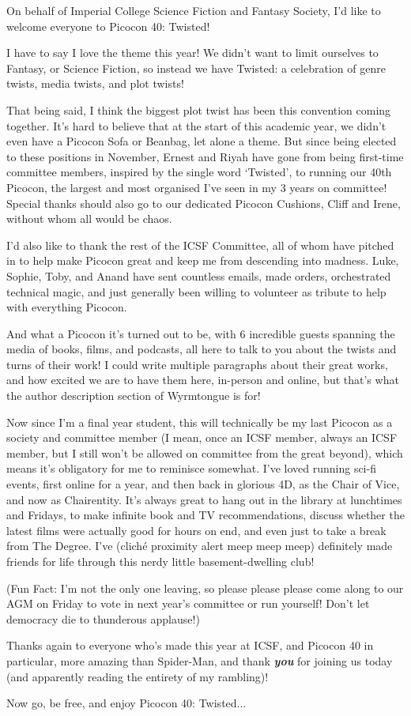 On behalf of Imperial College Science Fiction and Fantasy Society, I’d like to welcome everyone to Picocon 40: Twisted! 

I have to say I love the theme this year! We didn’t want to limit ourselves to Fantasy, or Science Fiction, so instead we have Twisted: a celebration of genre twists, media twists, and plot twists!

That being said, I think the biggest plot twist has been this convention coming together. It’s hard to believe that at the start of this academic year, we didn’t even have a Picocon Sofa or Beanbag, let alone a theme. But since being elected to these positions in November, Ernest and Riyah have gone from being first-time committee members, inspired by the single word ‘Twisted’, to running our 40th Picocon, the largest and most organised I’ve seen in my 3 years on committee! Special thanks should also go to our dedicated Picocon Cushions, Cliff and Irene, without whom all would be chaos. 

I’d also like to thank the rest of the ICSF Committee, all of whom have pitched in to help make Picocon great and keep me from descending into madness. Luke, Sophie, Toby, and Anand have sent countless emails, made orders, orchestrated technical magic, and just generally been willing to volunteer as tribute to help with everything Picocon. 

And what a Picocon it’s turned out to be, with 6 incredible guests spanning the media of books, films, and podcasts, all here to talk to you about the twists and turns of their work! I could write multiple paragraphs about their great works, and how excited we are to have them here, in-person and online, but that’s what the author description section of Wyrmtongue is for!

Now since I’m a final year student, this will technically be my last Picocon as a society and committee member (I mean, once an ICSF member, always an ICSF member, but I still won’t be allowed on committee from the great beyond), which means it’s obligatory for me to reminisce somewhat. I’ve loved running sci-fi events, first online for a year, and then back in glorious 4D, as the Chair of Vice, and now as Chairentity. It’s always great to hang out in the library at lunchtimes and Fridays, to make infinite book and TV recommendations, discuss whether the latest films were actually good for hours on end, and even just to take a break from The Degree. I’ve (cliché proximity alert meep meep meep) definitely made friends for life through this nerdy little basement-dwelling club!

(Fun Fact: I’m not the only one leaving, so please please please come along to our AGM on Friday to vote in next year’s committee or run yourself! Don’t let democracy die to thunderous applause!)

Thanks again to everyone who’s made this year at ICSF, and Picocon 40 in particular, more amazing than Spider-Man, and thank \textbf{\textit{you}} for joining us today (and apparently reading the entirety of my rambling)! 

Now go, be free, and enjoy Picocon 40: Twisted... 
